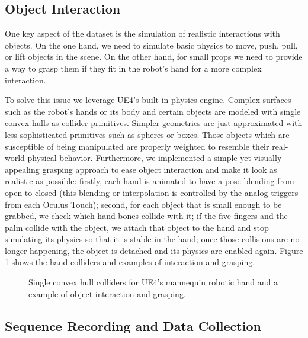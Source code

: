 \clearpage

\subsection{Object Interaction}

One key aspect of the dataset is the simulation of realistic interactions with objects. On the one hand, we need to simulate basic physics to move, push, pull, or lift objects in the scene. On the other hand, for small props we need to provide a way to grasp them if they fit in the robot's hand for a more complex interaction.

To solve this issue we leverage \ac{UE4}'s built-in physics engine. Complex surfaces such as the robot's hands or its body and certain objects are modeled with single convex hulls as collider primitives. Simpler geometries are just approximated with less sophisticated primitives such as spheres or boxes. Those objects which are susceptible of being manipulated are properly weighted to resemble their real-world physical behavior. Furthermore, we implemented a simple yet visually appealing grasping approach to ease object interaction and make it look as realistic as possible: firstly, each hand is animated to have a pose blending from open to closed (this blending or interpolation is controlled by the analog triggers from each Oculus Touch); second, for each object that is small enough to be grabbed, we check which hand bones collide with it; if the five fingers and the palm collide with the object, we attach that object to the hand and stop simulating its physics so that it is stable in the hand; once those collisions are no longer happening, the object is detached and its physics are enabled again. Figure \ref{fig:object_interaction} shows the hand colliders and examples of interaction and grasping.

\begin{figure}[!htb]
  \centering
  \caption{Single convex hull colliders for \ac{UE4}'s mannequin robotic hand and a example of object interaction and grasping.}
  \label{fig:object_interaction}
\end{figure}

\subsection{Sequence Recording and Data Collection}

